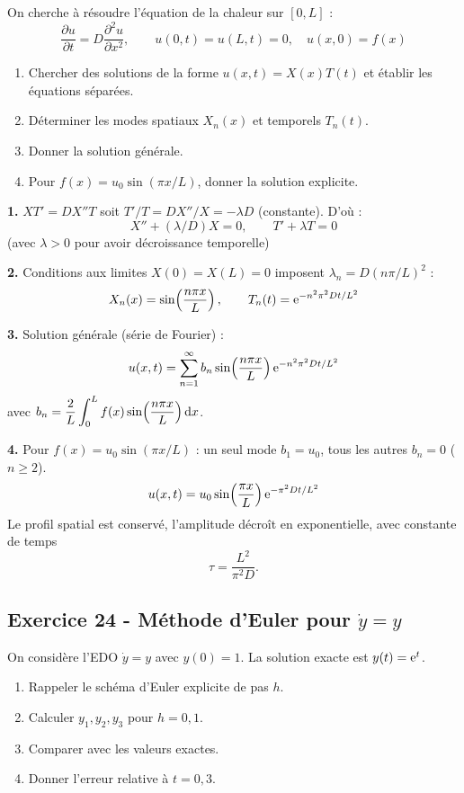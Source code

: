 \documentclass[12pt,a4paper]{article}
\begin{document}
\begin{boiteexercice}
On cherche à résoudre l'équation de la chaleur sur $[0, L]$ :
\[
\frac{\partial u}{\partial t} = D\frac{\partial^2 u}{\partial x^2}, \qquad u(0,t) = u(L,t) = 0, \quad u(x, 0) = f(x)
\]
\begin{enumerate}
  \item Chercher des solutions de la forme $u(x,t) = X(x)T(t)$ et établir les équations séparées.
  \item Déterminer les modes spatiaux $X_n(x)$ et temporels $T_n(t)$.
  \item Donner la solution générale.
  \item Pour $f(x) = u_0\sin(\pi x/L)$, donner la solution explicite.
\end{enumerate}
\end{boiteexercice}

\begin{boitecorrige}
\textbf{1.} $X T' = D X'' T$ soit $T'/T = D X''/X = -\lambda D$ (constante). D'où :
\[
X'' + (\lambda/D) X = 0, \qquad T' + \lambda T = 0
\]
(avec $\lambda > 0$ pour avoir décroissance temporelle)

\textbf{2.} Conditions aux limites $X(0) = X(L) = 0$ imposent $\lambda_n = D(n\pi/L)^2$ :
\[
X_n(x) = \sin\!\left(\frac{n\pi x}{L}\right), \qquad T_n(t) = \mathrm{e}^{-n^2\pi^2 D t/L^2}
\]

\textbf{3.} Solution générale (série de Fourier) :
\[
u(x,t) = \sum_{n=1}^\infty b_n \sin\!\left(\frac{n\pi x}{L}\right) \mathrm{e}^{-n^2\pi^2 D t/L^2}
\]
avec $b_n = \dfrac{2}{L}\displaystyle\int_0^L f(x)\sin\!\left(\dfrac{n\pi x}{L}\right)\mathrm{d} x$.

\textbf{4.} Pour $f(x) = u_0\sin(\pi x/L)$ : un seul mode $b_1 = u_0$, tous les autres $b_n = 0$ ($n\geq 2$).
\[
u(x,t) = u_0\sin\!\left(\frac{\pi x}{L}\right)\mathrm{e}^{-\pi^2 D t/L^2}
\]
Le profil spatial est conservé, l'amplitude décroît en exponentielle, avec constante de temps
\[
\tau = \frac{L^2}{\pi^2 D}.
\]
\end{boitecorrige}

\subsection*{Exercice 24 - Méthode d'Euler pour $\dot y = y$ \niveau{\facile}}

\begin{boiteexercice}
On considère l'EDO $\dot y = y$ avec $y(0) = 1$. La solution exacte est $y(t) = \mathrm{e}^t$.
\begin{enumerate}
  \item Rappeler le schéma d'Euler explicite de pas $h$.
  \item Calculer $y_1, y_2, y_3$ pour $h = 0{,}1$.
  \item Comparer avec les valeurs exactes.
  \item Donner l'erreur relative à $t = 0{,}3$.
\end{enumerate}
\end{boiteexercice}
\end{document}
